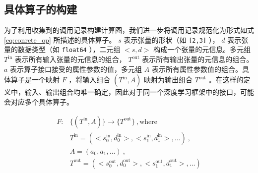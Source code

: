 

    

\subsection{具体算子的构建}
\label{sec:build_cop}

为了利用收集到的调用记录构建计算图，我们进一步将调用记录规范化为形式如式 \eqref{eq:conrete_op} 所描述的具体算子。 $s$ 表示张量的形状（如 \texttt{[2,3]} ）， $d$ 表示张量的数据类型（如 \texttt{float64} ），二元组 $<s, d>$ 构成一个张量的元信息。多元组 $T^\text{in}$ 表示所有输入张量的元信息的组合， $T^\text{out}$ 表示所有输出张量的元信息的组合。 $a$ 表示算子接口接受的属性参数的值，多元组 $A$ 表示所有属性参数值的组合。具体算子是一个映射 $F$ ，将输入组合 $(T^\text{in}, A)$ 映射为输出组合 $T^\text{out}$ 。在这样的定义中，输入、输出组合均唯一确定，因此对于同一个深度学习框架中的接口，可能会对应多个具体算子。

\begin{equation}
\label{eq:conrete_op}
\begin{aligned}
F: &\{(T^\text{in}, A)\} \rightarrow \{T^\text{out}\} ~, \text{where} \\
&T^\text{in} = (<s^\text{in}_0, d^\text{in}_0>, <s^\text{in}_1, d^\text{in}_1>, \dots) ~, \\
&A = (a_0, a_1, \dots) ~, \\
&T^\text{out} = (<s^\text{out}_0, d^\text{out}_0>, <s^\text{out}_1, d^\text{out}_1>, \dots)
\end{aligned}
\end{equation}




